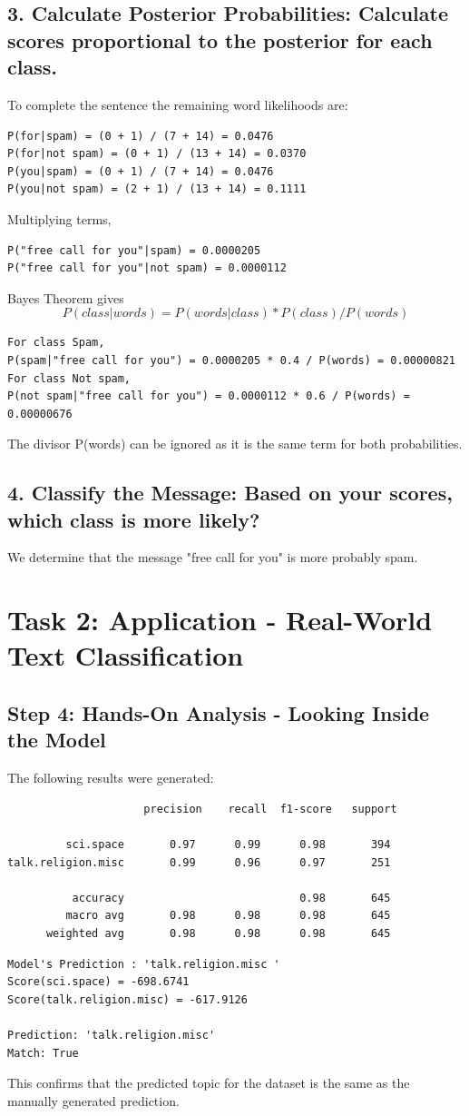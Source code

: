 \documentclass[11pt]{article}
\begin{document}
\subsection{3. Calculate Posterior Probabilities: Calculate scores proportional to the posterior for each class.}
To complete the sentence the remaining word likelihoods are: 
\begin{verbatim}
P(for|spam) = (0 + 1) / (7 + 14) = 0.0476
P(for|not spam) = (0 + 1) / (13 + 14) = 0.0370
P(you|spam) = (0 + 1) / (7 + 14) = 0.0476
P(you|not spam) = (2 + 1) / (13 + 14) = 0.1111
\end{verbatim}

Multiplying terms, 
\begin{verbatim}
P("free call for you"|spam) = 0.0000205
P("free call for you"|not spam) = 0.0000112
\end{verbatim}

Bayes Theorem gives
\begin{equation}
    P(class|words) = P(words|class)*P(class) / P(words)
\end{equation}

\begin{verbatim}
For class Spam, 
P(spam|"free call for you") = 0.0000205 * 0.4 / P(words) = 0.00000821
For class Not spam, 
P(not spam|"free call for you") = 0.0000112 * 0.6 / P(words) = 0.00000676
\end{verbatim}

The divisor P(words) can be ignored as it is the same term for both probabilities.

\subsection{4. Classify the Message: Based on your scores, which class is more likely?}
We determine that the message "free call for you" is more probably spam.

\section{Task 2: Application - Real-World Text Classification}
\subsection{Step 4: Hands-On Analysis - Looking Inside the Model}
The following results were generated:
\begin{verbatim}
                     precision    recall  f1-score   support

         sci.space       0.97      0.99      0.98       394
talk.religion.misc       0.99      0.96      0.97       251

          accuracy                           0.98       645
         macro avg       0.98      0.98      0.98       645
      weighted avg       0.98      0.98      0.98       645
\end{verbatim}

\begin{verbatim}
Model's Prediction : 'talk.religion.misc '
Score(sci.space) = -698.6741
Score(talk.religion.misc) = -617.9126

Prediction: 'talk.religion.misc'
Match: True
\end{verbatim}

This confirms that the predicted topic for the dataset is the same as the manually generated prediction.
\end{document}
